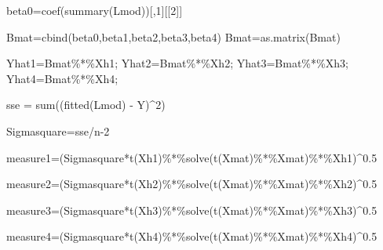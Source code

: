 \documentclass[
]{article}
\newenvironment{Shaded}{\begin{snugshade}}{\end{snugshade}}
\newcommand{\DecValTok}[1]{\textcolor[rgb]{0.00,0.00,0.81}{#1}}
\newcommand{\FloatTok}[1]{\textcolor[rgb]{0.00,0.00,0.81}{#1}}
\newcommand{\FunctionTok}[1]{\textcolor[rgb]{0.00,0.00,0.00}{#1}}
\newcommand{\NormalTok}[1]{#1}
\newcommand{\OtherTok}[1]{\textcolor[rgb]{0.56,0.35,0.01}{#1}}
\newcommand{\SpecialCharTok}[1]{\textcolor[rgb]{0.00,0.00,0.00}{#1}}
\begin{document}
\begin{Shaded}
\begin{Highlighting}[]
\NormalTok{beta0}\OtherTok{=}\FunctionTok{coef}\NormalTok{(}\FunctionTok{summary}\NormalTok{(Lmod))[,}\DecValTok{1}\NormalTok{][[}\DecValTok{2}\NormalTok{]]}

\NormalTok{Bmat}\OtherTok{=}\FunctionTok{cbind}\NormalTok{(beta0,beta1,beta2,beta3,beta4)}
\NormalTok{Bmat}\OtherTok{=}\FunctionTok{as.matrix}\NormalTok{(Bmat)}

\NormalTok{Yhat1}\OtherTok{=}\NormalTok{Bmat}\SpecialCharTok{\%*\%}\NormalTok{Xh1;}
\NormalTok{Yhat2}\OtherTok{=}\NormalTok{Bmat}\SpecialCharTok{\%*\%}\NormalTok{Xh2;}
\NormalTok{Yhat3}\OtherTok{=}\NormalTok{Bmat}\SpecialCharTok{\%*\%}\NormalTok{Xh3;}
\NormalTok{Yhat4}\OtherTok{=}\NormalTok{Bmat}\SpecialCharTok{\%*\%}\NormalTok{Xh4;}

\NormalTok{sse }\OtherTok{=} \FunctionTok{sum}\NormalTok{((}\FunctionTok{fitted}\NormalTok{(Lmod) }\SpecialCharTok{{-}}\NormalTok{ Y)}\SpecialCharTok{\^{}}\DecValTok{2}\NormalTok{)}

\NormalTok{Sigmasquare}\OtherTok{=}\NormalTok{sse}\SpecialCharTok{/}\NormalTok{n}\DecValTok{{-}2}

\NormalTok{measure1}\OtherTok{=}\NormalTok{(Sigmasquare}\SpecialCharTok{*}\FunctionTok{t}\NormalTok{(Xh1)}\SpecialCharTok{\%*\%}\FunctionTok{solve}\NormalTok{(}\FunctionTok{t}\NormalTok{(Xmat)}\SpecialCharTok{\%*\%}\NormalTok{Xmat)}\SpecialCharTok{\%*\%}\NormalTok{Xh1)}\SpecialCharTok{\^{}}\FloatTok{0.5}

\NormalTok{measure2}\OtherTok{=}\NormalTok{(Sigmasquare}\SpecialCharTok{*}\FunctionTok{t}\NormalTok{(Xh2)}\SpecialCharTok{\%*\%}\FunctionTok{solve}\NormalTok{(}\FunctionTok{t}\NormalTok{(Xmat)}\SpecialCharTok{\%*\%}\NormalTok{Xmat)}\SpecialCharTok{\%*\%}\NormalTok{Xh2)}\SpecialCharTok{\^{}}\FloatTok{0.5}

\NormalTok{measure3}\OtherTok{=}\NormalTok{(Sigmasquare}\SpecialCharTok{*}\FunctionTok{t}\NormalTok{(Xh3)}\SpecialCharTok{\%*\%}\FunctionTok{solve}\NormalTok{(}\FunctionTok{t}\NormalTok{(Xmat)}\SpecialCharTok{\%*\%}\NormalTok{Xmat)}\SpecialCharTok{\%*\%}\NormalTok{Xh3)}\SpecialCharTok{\^{}}\FloatTok{0.5}

\NormalTok{measure4}\OtherTok{=}\NormalTok{(Sigmasquare}\SpecialCharTok{*}\FunctionTok{t}\NormalTok{(Xh4)}\SpecialCharTok{\%*\%}\FunctionTok{solve}\NormalTok{(}\FunctionTok{t}\NormalTok{(Xmat)}\SpecialCharTok{\%*\%}\NormalTok{Xmat)}\SpecialCharTok{\%*\%}\NormalTok{Xh4)}\SpecialCharTok{\^{}}\FloatTok{0.5}


\end{Highlighting}
\end{Shaded}
\end{document}
